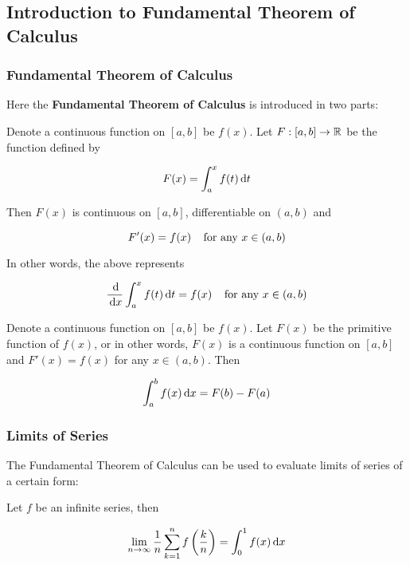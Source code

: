 \documentclass[a4paper,12pt]{article}
\begin{document}
\propdisp

\subsection{Introduction to Fundamental Theorem of Calculus}
\subsubsection{Fundamental Theorem of Calculus}
\begin{thm}
  Here the \textbf{Fundamental Theorem of Calculus} is introduced in two parts:

  \begin{alist}
    \item Denote a continuous function on $[a,b]$ be $f(x)$. Let $F:[a,b]\to\mathbb{R}$ be the function defined by

    $$F(x)=\int_{a}^{x}f(t)\,\mathrm{d} t$$\s

    Then $F(x)$ is continuous on $[a,b]$, differentiable on $(a,b)$ and

    $$F'(x)=f(x)\;\;\;\;\text{for any }x\in(a,b)$$\s

    In other words, the above represents

    $$\frac{\,\mathrm{d}}{\,\mathrm{d} x}\int_{a}^{x}f(t)\,\mathrm{d} t=f(x)\;\;\;\;\text{for any }x\in(a,b)$$

    \item Denote a continuous function on $[a,b]$ be $f(x)$. Let $F(x)$ be the primitive function of $f(x)$, or in other words, $F(x)$ is a continuous function on $[a,b]$ and $F'(x)=f(x)$ for any $x\in(a,b)$. Then

    $$\int_{a}^{b}f(x)\,\mathrm{d} x=F(b)-F(a)$$
  \end{alist}
\end{thm}

\subsubsection{Limits of Series}
The Fundamental Theorem of Calculus can be used to evaluate limits of series of a certain form:\n

\begin{pst}
  Let $f$ be an infinite series, then

  $$\lim_{n\to\infty}\frac{1}{n}\sum_{k=1}^{n}f\left( \frac{k}{n}\right)=\int_{0}^{1}f(x)\,\mathrm{d} x$$
\end{pst}
\end{document}
